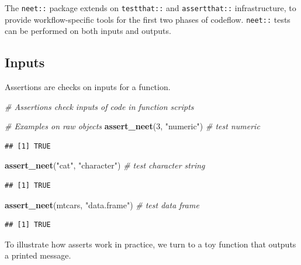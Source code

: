 \documentclass[
]{article}
\newenvironment{Shaded}{\begin{snugshade}}{\end{snugshade}}
\newcommand{\CommentTok}[1]{\textcolor[rgb]{0.56,0.35,0.01}{\textit{#1}}}
\newcommand{\DecValTok}[1]{\textcolor[rgb]{0.00,0.00,0.81}{#1}}
\newcommand{\KeywordTok}[1]{\textcolor[rgb]{0.13,0.29,0.53}{\textbf{#1}}}
\newcommand{\NormalTok}[1]{#1}
\newcommand{\StringTok}[1]{\textcolor[rgb]{0.31,0.60,0.02}{#1}}
\begin{document}
The \texttt{neet::} package extends on \texttt{testthat::} and \texttt{assertthat::} infrastructure, to provide workflow-specific tools for the first two phases of codeflow. \texttt{neet::} tests can be performed on both inputs and outputs.

\hypertarget{inputs}{%
\subsection{Inputs}\label{inputs}}

Assertions are checks on inputs for a function.

\begin{Shaded}
\begin{Highlighting}[]
\CommentTok{\# Assertions check inputs of code in function scripts}

\CommentTok{\# Examples on raw objects}
\KeywordTok{assert\_neet}\NormalTok{(}\DecValTok{3}\NormalTok{, }\StringTok{"numeric"}\NormalTok{) }\CommentTok{\# test numeric}
\end{Highlighting}
\end{Shaded}

\begin{verbatim}
## [1] TRUE
\end{verbatim}

\begin{Shaded}
\begin{Highlighting}[]
\KeywordTok{assert\_neet}\NormalTok{(}\StringTok{"cat"}\NormalTok{, }\StringTok{"character"}\NormalTok{) }\CommentTok{\# test character string}
\end{Highlighting}
\end{Shaded}

\begin{verbatim}
## [1] TRUE
\end{verbatim}

\begin{Shaded}
\begin{Highlighting}[]
\KeywordTok{assert\_neet}\NormalTok{(mtcars, }\StringTok{"data.frame"}\NormalTok{) }\CommentTok{\# test data frame}
\end{Highlighting}
\end{Shaded}

\begin{verbatim}
## [1] TRUE
\end{verbatim}

To illustrate how asserts work in practice, we turn to a toy function that outputs a printed message.
\end{document}
